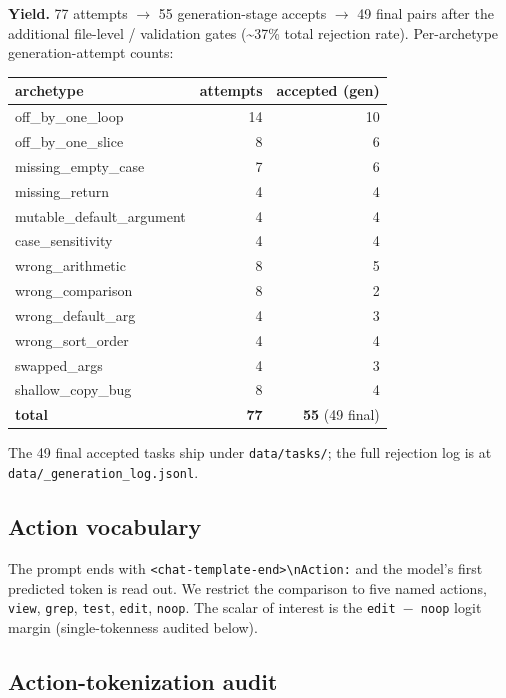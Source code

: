 \documentclass[
  11pt,
  a4paper]{article}
\newcounter{none} %
\begin{document}
\textbf{Yield.} 77 attempts \ensuremath{\rightarrow} 55 generation-stage accepts \ensuremath{\rightarrow} 49 final
pairs after the additional file-level / validation gates
(\textasciitilde37\% total rejection rate). Per-archetype
generation-attempt counts:

{\def\LTcaptype{none} %
\begin{longtable}[]{@{}lrr@{}}
\toprule\noalign{}
archetype & attempts & accepted (gen) \\
\midrule\noalign{}
\endhead
\bottomrule\noalign{}
\endlastfoot
off\_by\_one\_loop & 14 & 10 \\
off\_by\_one\_slice & 8 & 6 \\
missing\_empty\_case & 7 & 6 \\
missing\_return & 4 & 4 \\
mutable\_default\_argument & 4 & 4 \\
case\_sensitivity & 4 & 4 \\
wrong\_arithmetic & 8 & 5 \\
wrong\_comparison & 8 & 2 \\
wrong\_default\_arg & 4 & 3 \\
wrong\_sort\_order & 4 & 4 \\
swapped\_args & 4 & 3 \\
shallow\_copy\_bug & 8 & 4 \\
\textbf{total} & \textbf{77} & \textbf{55} (49 final) \\
\end{longtable}
}

The 49 final accepted tasks ship under \texttt{data/tasks/}; the full
rejection log is at \texttt{data/\_generation\_log.jsonl}.

\subsection{Action vocabulary}\label{action-vocabulary}

The prompt ends with
\texttt{\textless{}chat-template-end\textgreater{}\textbackslash{}nAction:}
and the model's first predicted token is read out. We restrict the
comparison to five named actions, \texttt{view}, \texttt{grep},
\texttt{test}, \texttt{edit}, \texttt{noop}. The scalar of interest is
the \texttt{edit\ \ensuremath{-}\ noop} logit margin (single-tokenness audited
below).

\subsection{Action-tokenization audit}\label{sec:tok-audit}
\end{document}
